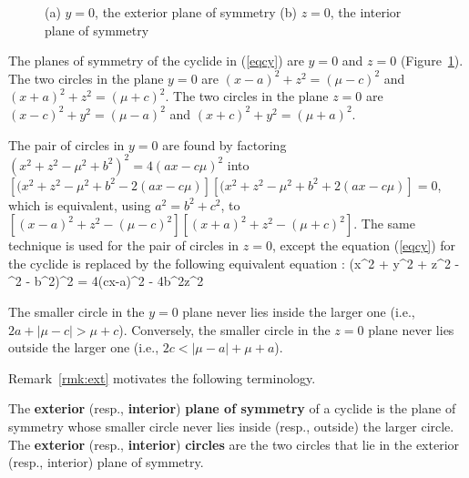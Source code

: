 
\begin{figure}
\vspace{5in}
\caption{(a) $y=0$, the exterior plane of symmetry
         (b) $z=0$, the interior plane of symmetry}
\label{fig:sym}
\end{figure}

\begin{lemma}
\label{lem:sym}
The planes of symmetry of the cyclide in (\ref{eqcy}) are $y=0$ and $z=0$
(Figure~\ref{fig:sym}).
The two circles in the plane $y=0$ are $(x-a)^2 + z^2 = (\mu - c)^2$
and $(x+a)^2 + z^2 = (\mu + c)^2$.
The two circles in the plane $z=0$ are $(x-c)^2 + y^2 = (\mu - a)^2$
and $(x+c)^2 + y^2 = (\mu + a)^2$.
\end{lemma}
\prf 
The pair of circles in $y=0$ are found by factoring 
$(x^{2} + z^{2} - \mu^{2} + b^{2})^{2} = 4(ax-c\mu)^{2}$
into $[(x^{2} + z^{2} - \mu^{2} + b^{2} - 2(ax-c\mu)]
      [(x^{2} + z^{2} - \mu^{2} + b^{2} + 2(ax-c\mu)] = 0$,
which is equivalent, using $a^2 = b^2 + c^2$, to
$[(x-a)^2 + z^2 - (\mu - c)^2][(x+a)^2 + z^2 - (\mu + c)^2]$.
The same technique is used for the pair of circles in $z=0$,
except the equation (\ref{eqcy}) for the cyclide is replaced by
the following equivalent equation \cite{F12}:
\be
(x^{2} + y^{2} + z^{2} - \mu^{2} - b^{2})^{2} = 4(cx-a\mu)^{2} - 4b^{2}z^{2}
\ee
\QED

\begin{rmk}
\label{rmk:ext}
The smaller circle in the $y=0$ plane never lies inside the larger one
(i.e., $2a + |\mu - c| > \mu + c$).
Conversely, the smaller circle in the $z=0$ plane never lies outside the 
larger one (i.e., $2c < |\mu - a| + \mu + a$).
\end{rmk}

Remark~\ref{rmk:ext} motivates the following terminology.

\begin{defn2}
The {\bf exterior} (resp., {\bf interior}) {\bf plane of symmetry} of a cyclide
is the plane of symmetry whose smaller circle never lies inside 
(resp., outside) the larger circle.
The {\bf exterior} (resp., {\bf interior}) {\bf circles} are the two circles 
that lie in the exterior (resp., interior) plane of symmetry.
\end{defn2}

